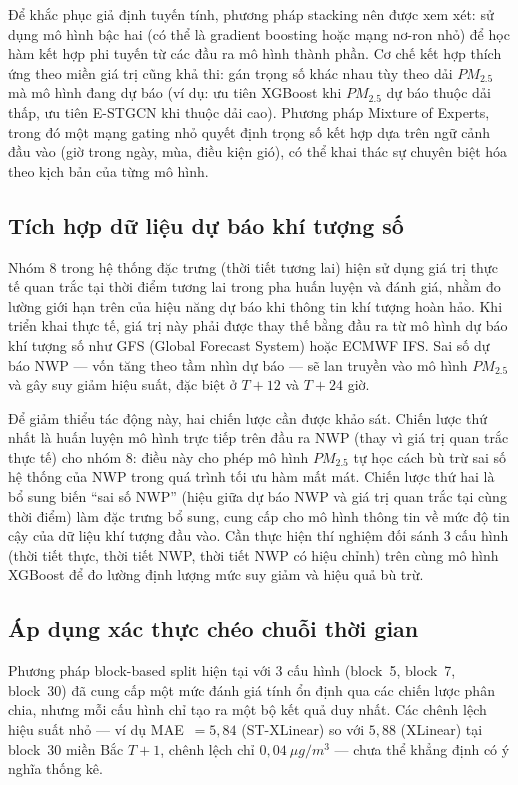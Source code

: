 Để khắc phục giả định tuyến tính, phương pháp stacking nên được xem xét: sử dụng mô hình bậc hai (có thể là gradient boosting hoặc mạng nơ-ron nhỏ) để học hàm kết hợp phi tuyến từ các đầu ra mô hình thành phần. Cơ chế kết hợp thích ứng theo miền giá trị cũng khả thi: gán trọng số khác nhau tùy theo dải $PM_{2.5}$ mà mô hình đang dự báo (ví dụ: ưu tiên XGBoost khi $PM_{2.5}$ dự báo thuộc dải thấp, ưu tiên E-STGCN khi thuộc dải cao). Phương pháp Mixture of Experts, trong đó một mạng gating nhỏ quyết định trọng số kết hợp dựa trên ngữ cảnh đầu vào (giờ trong ngày, mùa, điều kiện gió), có thể khai thác sự chuyên biệt hóa theo kịch bản của từng mô hình.

\subsection{Tích hợp dữ liệu dự báo khí tượng số}

Nhóm 8 trong hệ thống đặc trưng (thời tiết tương lai) hiện sử dụng giá trị thực tế quan trắc tại thời điểm tương lai trong pha huấn luyện và đánh giá, nhằm đo lường giới hạn trên của hiệu năng dự báo khi thông tin khí tượng hoàn hảo. Khi triển khai thực tế, giá trị này phải được thay thế bằng đầu ra từ mô hình dự báo khí tượng số như GFS (Global Forecast System) hoặc ECMWF IFS. Sai số dự báo NWP --- vốn tăng theo tầm nhìn dự báo --- sẽ lan truyền vào mô hình $PM_{2.5}$ và gây suy giảm hiệu suất, đặc biệt ở $T{+}12$ và $T{+}24$ giờ.

Để giảm thiểu tác động này, hai chiến lược cần được khảo sát. Chiến lược thứ nhất là huấn luyện mô hình trực tiếp trên đầu ra NWP (thay vì giá trị quan trắc thực tế) cho nhóm 8: điều này cho phép mô hình $PM_{2.5}$ tự học cách bù trừ sai số hệ thống của NWP trong quá trình tối ưu hàm mất mát. Chiến lược thứ hai là bổ sung biến ``sai số NWP'' (hiệu giữa dự báo NWP và giá trị quan trắc tại cùng thời điểm) làm đặc trưng bổ sung, cung cấp cho mô hình thông tin về mức độ tin cậy của dữ liệu khí tượng đầu vào. Cần thực hiện thí nghiệm đối sánh 3 cấu hình (thời tiết thực, thời tiết NWP, thời tiết NWP có hiệu chỉnh) trên cùng mô hình XGBoost để đo lường định lượng mức suy giảm và hiệu quả bù trừ.

\subsection{Áp dụng xác thực chéo chuỗi thời gian}

Phương pháp block-based split hiện tại với 3 cấu hình (block~5, block~7, block~30) đã cung cấp một mức đánh giá tính ổn định qua các chiến lược phân chia, nhưng mỗi cấu hình chỉ tạo ra một bộ kết quả duy nhất. Các chênh lệch hiệu suất nhỏ --- ví dụ MAE~$= 5{,}84$ (ST-XLinear) so với $5{,}88$ (XLinear) tại block~30 miền Bắc $T{+}1$, chênh lệch chỉ $0{,}04~\mu g/m^3$ --- chưa thể khẳng định có ý nghĩa thống kê.

